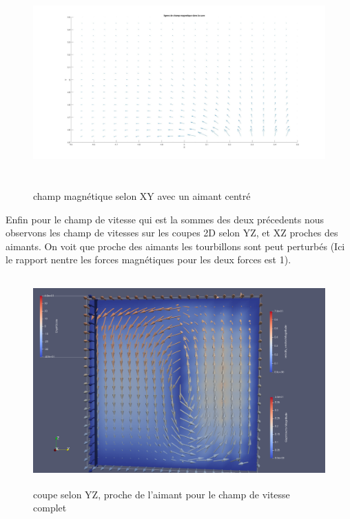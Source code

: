 \documentclass[a4paper,12pt,titlepage]{report}
\begin{document}
\begin{onehalfspace}
\begin{figure}[!h]
\begin{center}
\includegraphics[height = 8cm, keepaspectratio]{graphes/coupe_2D_champ_decentre.jpg} 
\caption{\label{figure 39 } champ magnétique selon XY avec un aimant centré}
\end{center}
\end{figure}

\newpage
Enfin pour le champ de vitesse qui est la sommes des deux précedents nous observons les champ de vitesses sur les coupes 2D selon YZ, et XZ proches des aimants.  On voit que proche des aimants les tourbillons sont peut perturbés (Ici le rapport nentre les forces magnétiques pour les deux forces est 1).
\newpage
\begin{figure}[!h]
\center 
\includegraphics[height = 8cm, keepaspectratio]{graphes/Paraview/total_coupe_pret_aimant_decentre.png} 
\caption{\label{figure 322 } coupe selon YZ, proche de l'aimant pour le champ de vitesse complet}
\end{figure}


\end{onehalfspace}
\end{document}
